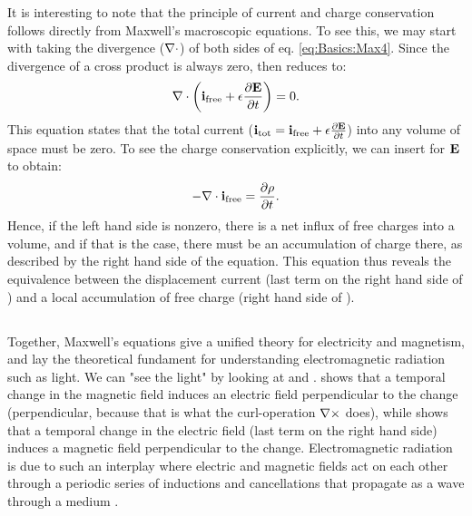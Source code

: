 It is interesting to note that the principle of current and charge conservation follows directly from Maxwell's macroscopic equations. To see this, we may start with taking the divergence (${\bf \nabla} \cdot$) of both sides of eq. \ref{eq:Basics:Max4}. Since the divergence of a cross product is always zero,  then reduces to:
\begin{equation}
{\bf \nabla} \cdot \left( {\bf i}_\text{free} +  \epsilon \frac{\partial {\bf E}}{\partial t} \right) = 0.
\label{eq:Basics:Max4dot}
\end{equation}
This equation states that the total current (${\bf i}_\text{tot} = {\bf i}_\text{free} +  \epsilon \frac{\partial {\bf E}}{\partial t}$) into any volume of space must be zero. To see the charge conservation explicitly, we can insert  for ${\bf E}$ to obtain:
\begin{equation}
- {\bf \nabla} \cdot {\bf i}_\text{free} =  \frac{\partial \rho}{\partial t}.
\label{eq:Basics:currentconservation}
\end{equation}
Hence, if the left hand side is nonzero, there is a net influx of free charges into a volume, and if that is the case, there must be an accumulation of charge there, as described by the right hand side of the equation. This equation thus reveals the equivalence between the displacement current (last term on the right hand side of ) and a local accumulation of free charge (right hand side of ).


\subsection{}
\label{sec:Basics:Quasistatic} 
Together, Maxwell's equations give a unified theory for electricity and magnetism, and lay the theoretical fundament for understanding electromagnetic radiation such as light. We can "see the light" by looking at  and .  shows that a temporal change in the magnetic field induces an electric field perpendicular to the change (perpendicular, because that is what the curl-operation ${\bf \nabla} \times$ does), while  shows that a temporal change in the electric field (last term on the right hand side) induces a magnetic field perpendicular to the change. Electromagnetic radiation is due to such an interplay where electric and magnetic fields act on each other through a periodic series of inductions and cancellations that propagate as a wave through a medium 
.  

